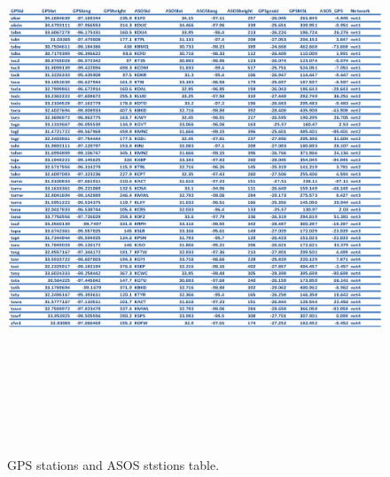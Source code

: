 \documentclass[proposal]{umassthesis}
\begin{document}
\begin{figure}[!h]
\begin{center}
\includegraphics[width = 15.5cm,height = 17cm]{GPS_ASOS_table.eps}
\caption{GPS stations and ASOS ststions table.}\label{table:GPS_ASOS_table}
\end{center}
\end{figure}

\backmatter  %




\end{document}
